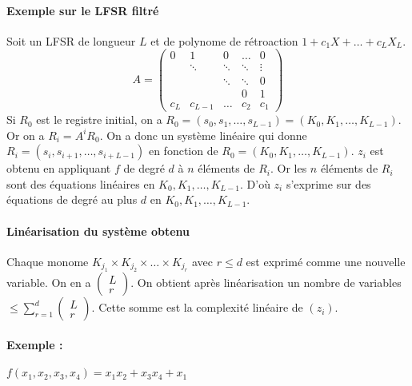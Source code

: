 \documentclass[12pt,a4paper]{report}
\begin{document}
\paragraph{Exemple sur le LFSR filtré \\}
Soit un LFSR de longueur $L$ et de polynome de rétroaction $1+c_1X+\ldots+c_LX_L$.
$$ A = \left( \begin{array}{ccccc}
0 & 1 & 0 & \ldots & 0 \\
 & \ddots & \ddots & \ddots & \vdots \\
 &        & \ddots & \ddots & 0 \\
 & & & 0 & 1 \\
 c_L & c_{L-1} & \ldots & c_2 & c_1 \end{array} \right) $$
Si $R_0$ est le registre initial, on a $R_0 = (s_0,s_1,\ldots,s_{L-1}) = (K_0,K_1,\ldots,K_{L-1})$. Or on a $R_i = A^iR_0$. On a donc un système linéaire qui donne $R_i = (s_i,s_{i+1}, \ldots, s_{i+L-1})$ en fonction de $R_0= (K_0,K_1,\ldots,K_{L-1})$. $z_i$ est obtenu en appliquant $f$ de degré $d$ à $n$ éléments de $R_i$. Or les $n$ éléments de $R_i$ sont des équations linéaires en $K_0,K_1,\ldots,K_{L-1}$. D'où $z_i$ s'exprime sur des équations de degré au plus $d$ en $K_0,K_1,\ldots,K_{L-1}$.
\paragraph{Linéarisation du système obtenu\\}
Chaque monome $K_{j_1}\times K_{j_2} \times \ldots \times K_{j_r}$ avec $r \leqslant d$ est exprimé comme une nouvelle variable. On en a $
 \left(\begin{array}{c} L \\ r \end{array} \right) $. On obtient après linéarisation un nombre de variables $\leqslant \displaystyle \sum_{r=1}^d \left(\begin{array}{c} L \\ r \end{array} \right) $. Cette somme est la complexité linéaire de $(z_i)$.
 
 \paragraph{Exemple :\\}
$f(x_1,x_2,x_3,x_4) = x_1x_2 + x_3x_4 +x_1$\\
\begin{center}
  \scalebox{0.6}{}	
\end{center}
\end{document}
